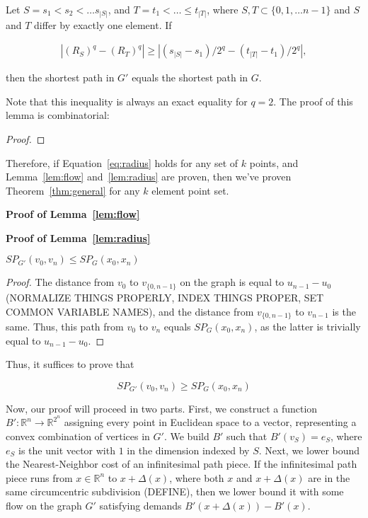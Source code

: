 \begin{lemma}\label{lem:radius} Let $S = s_1 < s_2 < \ldots s_{|S|}$, and $T =
t_1 < \ldots \leq t_{|T|}$, where $S, T \subset \{0,1,\ldots n-1\}$ and $S$ and
$T$ differ by exactly one element. If

\begin{align}\label{eq:radius} |(R_{S})^q-(R_{T})^q| \geq
|(s_{|S|}-s_1)/2^q-(t_{|T|}-t_1)/2^q|, \end{align}

then the shortest path in $G'$ equals the shortest path in $G$.

\end{lemma}

Note that this inequality is always an exact equality for $q=2$. The proof of
this lemma is combinatorial:

\begin{proof}

\end{proof}

Therefore, if Equation~\ref{eq:radius} holds for any set of $k$ points, and
Lemma~\ref{lem:flow} and~\ref{lem:radius} are proven, then we've proven
Theorem~\ref{thm:general} for any $k$ element point set.

\textbf{Proof of Lemma~\ref{lem:flow}}

\textbf{Proof of Lemma~\ref{lem:radius}}

\begin{lemma} $SP_{G'}(v_0, v_n) \leq SP_G(x_0, x_n)$

\end{lemma}

\begin{proof}

The distance from $v_0$ to $v_{\{0,n-1\}}$ on the graph is equal to
$u_{n-1}-u_0$ (NORMALIZE THINGS PROPERLY, INDEX THINGS PROPER, SET COMMON
VARIABLE NAMES), and the distance from $v_{\{0, n-1\}}$ to $v_{n-1}$ is the
same. Thus, this path from $v_0$ to $v_n$ equals $SP_G(x_0, x_n)$, as the
latter is trivially equal to $u_{n-1} - u_0$.

\end{proof}

Thus, it suffices to prove that

\[ SP_{G'}(v_0, v_n) \geq SP_G(x_0, x_n) \]




Now, our proof will proceed in two parts. First, we construct a function
$B':\mathbb{R}^n \rightarrow \mathbb{R}^{2^n}$ assigning every point in
Euclidean space to a vector, representing a convex combination of vertices in
$G'$. We build $B'$ such that $B'(v_S)= e_S$, where $e_S$ is the unit vector
with $1$ in the dimension indexed by $S$. Next, we lower bound the
Nearest-Neighbor cost of an infinitesimal path piece. If the infinitesimal path
piece runs from $x \in \mathbb{R}^n$ to $x+\Delta(x)$, where both $x$ and
$x+\Delta(x)$ are in the same circumcentric subdivision (DEFINE), then we lower
bound it with some flow on the graph $G'$ satisfying demands $B'(x+\Delta(x)) -
B'(x)$.

